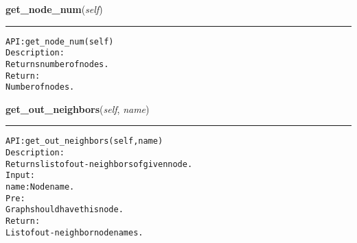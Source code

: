     \label{coinor:gimpy:graph:Graph:get_node_num}

    \vspace{0.5ex}

\hspace{.8\funcindent}\begin{boxedminipage}{\funcwidth}

    \raggedright \textbf{get\_node\_num}(\textit{self})

    \vspace{-1.5ex}

    \rule{\textwidth}{0.5\fboxrule}
\setlength{\parskip}{2ex}
\begin{alltt}

API: get\_node\_num(self)
Description:
Returns number of nodes.
Return:
    Number of nodes.
\end{alltt}

\setlength{\parskip}{1ex}
    \end{boxedminipage}

    \label{coinor:gimpy:graph:Graph:get_out_neighbors}

    \vspace{0.5ex}

\hspace{.8\funcindent}\begin{boxedminipage}{\funcwidth}

    \raggedright \textbf{get\_out\_neighbors}(\textit{self}, \textit{name})

    \vspace{-1.5ex}

    \rule{\textwidth}{0.5\fboxrule}
\setlength{\parskip}{2ex}
\begin{alltt}

API: get\_out\_neighbors(self, name)
Description:
Returns list of out-neighbors of given node.
Input:
    name: Node name.
Pre:
    Graph should have this node.
Return:
    List of out-neighbor node names.
\end{alltt}

\setlength{\parskip}{1ex}
    \end{boxedminipage}

